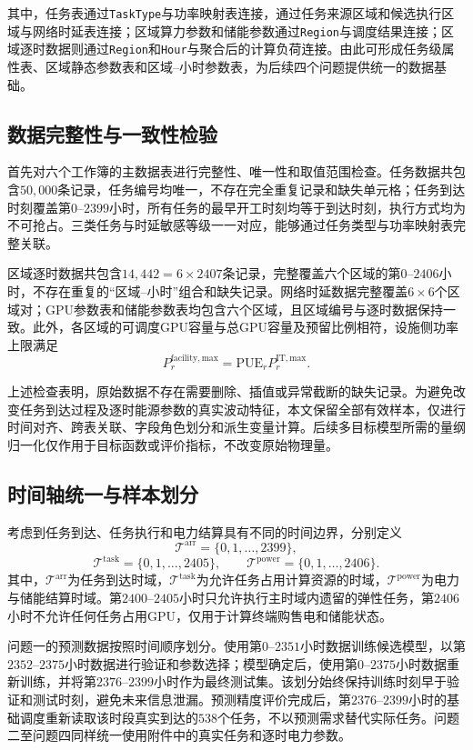 \documentclass[UTF8,a4paper,zihao=-4]{ctexart}
\begin{document}
其中，任务表通过\texttt{TaskType}与功率映射表连接，通过任务来源区域和候选执行区域与网络时延表连接；区域算力参数和储能参数通过\texttt{Region}与调度结果连接；区域逐时数据则通过\texttt{Region}和\texttt{Hour}与聚合后的计算负荷连接。由此可形成任务级属性表、区域静态参数表和区域--小时参数表，为后续四个问题提供统一的数据基础。

\subsection{数据完整性与一致性检验}

首先对六个工作簿的主数据表进行完整性、唯一性和取值范围检查。任务数据共包含$50{,}000$条记录，任务编号均唯一，不存在完全重复记录和缺失单元格；任务到达时刻覆盖第$0$--$2399$小时，所有任务的最早开工时刻均等于到达时刻，执行方式均为不可抢占。三类任务与时延敏感等级一一对应，能够通过任务类型与功率映射表完整关联。

区域逐时数据共包含$14{,}442=6\times2407$条记录，完整覆盖六个区域的第$0$--$2406$小时，不存在重复的“区域--小时”组合和缺失记录。网络时延数据完整覆盖$6\times6$个区域对；GPU参数表和储能参数表均包含六个区域，且区域编号与逐时数据保持一致。此外，各区域的可调度GPU容量与总GPU容量及预留比例相符，设施侧功率上限满足
\[
P_{r}^{\mathrm{facility,max}}
=
\mathrm{PUE}_{r}P_{r}^{\mathrm{IT,max}}.
\]

上述检查表明，原始数据不存在需要删除、插值或异常截断的缺失记录。为避免改变任务到达过程及逐时能源参数的真实波动特征，本文保留全部有效样本，仅进行时间对齐、跨表关联、字段角色划分和派生变量计算。后续多目标模型所需的量纲归一化仅作用于目标函数或评价指标，不改变原始物理量。

\subsection{时间轴统一与样本划分}

考虑到任务到达、任务执行和电力结算具有不同的时间边界，分别定义
\[
\mathcal{T}^{\mathrm{arr}}=\{0,1,\ldots,2399\},
\]
\[
\mathcal{T}^{\mathrm{task}}=\{0,1,\ldots,2405\},
\qquad
\mathcal{T}^{\mathrm{power}}=\{0,1,\ldots,2406\}.
\]
其中，$\mathcal{T}^{\mathrm{arr}}$为任务到达时域，$\mathcal{T}^{\mathrm{task}}$为允许任务占用计算资源的时域，$\mathcal{T}^{\mathrm{power}}$为电力与储能结算时域。第$2400$--$2405$小时只允许执行主时域内遗留的弹性任务，第$2406$小时不允许任何任务占用GPU，仅用于计算终端购售电和储能状态。

问题一的预测数据按照时间顺序划分。使用第$0$--$2351$小时数据训练候选模型，以第$2352$--$2375$小时数据进行验证和参数选择；模型确定后，使用第$0$--$2375$小时数据重新训练，并将第$2376$--$2399$小时作为最终测试集。该划分始终保持训练时刻早于验证和测试时刻，避免未来信息泄漏。预测精度评价完成后，第$2376$--$2399$小时的基础调度重新读取该时段真实到达的$538$个任务，不以预测需求替代实际任务。问题二至问题四同样统一使用附件中的真实任务和逐时电力参数。
\end{document}
